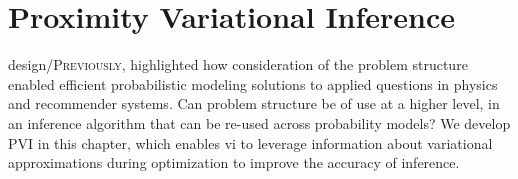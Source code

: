 \chapter{Proximity Variational Inference}
\label{ch:pvi}
\lettrine[image=true,lines=3]{design/P}{reviously},  highlighted how consideration of the problem structure enabled efficient probabilistic modeling solutions to applied questions in physics and recommender systems. Can problem structure be of use at a higher level, in an inference algorithm that can be re-used across probability models? We develop \acrlong{PVI} in this chapter, which enables \acrlong{vi} to leverage information about variational approximations during optimization to improve the accuracy of inference.